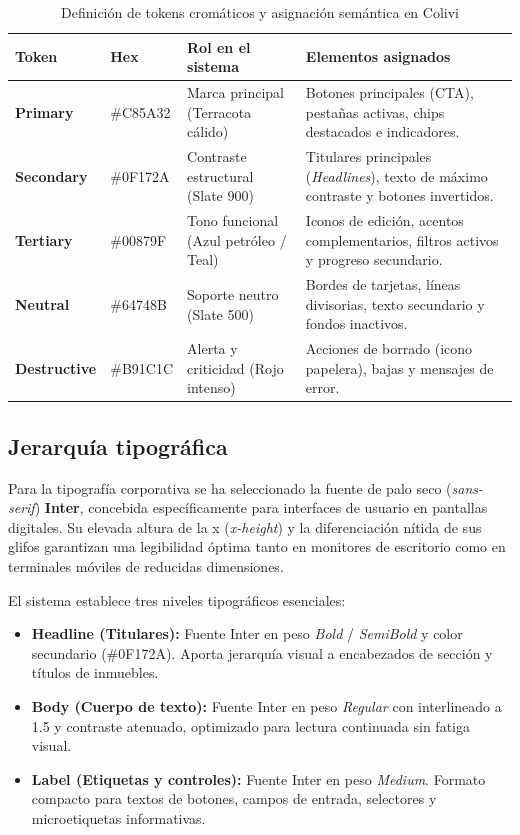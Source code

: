 \begin{table}[H]
    \centering
    \begin{tabular}{|p{2cm}|p{1.8cm}|p{4.2cm}|p{5cm}|}
        \hline
        \textbf{Token} & \textbf{Hex} & \textbf{Rol en el sistema} & \textbf{Elementos asignados} \\ \hline
        \textbf{Primary} & \#C85A32 & Marca principal (Terracota cálido) & Botones principales (CTA), pestañas activas, chips destacados e indicadores. \\ \hline
        \textbf{Secondary} & \#0F172A & Contraste estructural (Slate 900) & Titulares principales (\emph{Headlines}), texto de máximo contraste y botones invertidos. \\ \hline
        \textbf{Tertiary} & \#00879F & Tono funcional (Azul petróleo / Teal) & Iconos de edición, acentos complementarios, filtros activos y progreso secundario. \\ \hline
        \textbf{Neutral} & \#64748B & Soporte neutro (Slate 500) & Bordes de tarjetas, líneas divisorias, texto secundario y fondos inactivos. \\ \hline
        \textbf{Destructive} & \#B91C1C & Alerta y criticidad (Rojo intenso) & Acciones de borrado (icono papelera), bajas y mensajes de error. \\ \hline
    \end{tabular}
    \caption{Definición de tokens cromáticos y asignación semántica en Colivi}
    \label{tab:tokens_cromaticos}
\end{table}

\subsection{Jerarquía tipográfica}

Para la tipografía corporativa se ha seleccionado la fuente de palo seco (\emph{sans-serif}) \textbf{Inter}, concebida específicamente para interfaces de usuario en pantallas digitales. Su elevada altura de la x (\emph{x-height}) y la diferenciación nítida de sus glifos garantizan una legibilidad óptima tanto en monitores de escritorio como en terminales móviles de reducidas dimensiones.

El sistema establece tres niveles tipográficos esenciales:
\begin{itemize}
    \item \textbf{Headline (Titulares):} Fuente Inter en peso \emph{Bold} / \emph{SemiBold} y color secundario (\#0F172A). Aporta jerarquía visual a encabezados de sección y títulos de inmuebles.
    \item \textbf{Body (Cuerpo de texto):} Fuente Inter en peso \emph{Regular} con interlineado a 1.5 y contraste atenuado, optimizado para lectura continuada sin fatiga visual.
    \item \textbf{Label (Etiquetas y controles):} Fuente Inter en peso \emph{Medium}. Formato compacto para textos de botones, campos de entrada, selectores y microetiquetas informativas.
\end{itemize}

